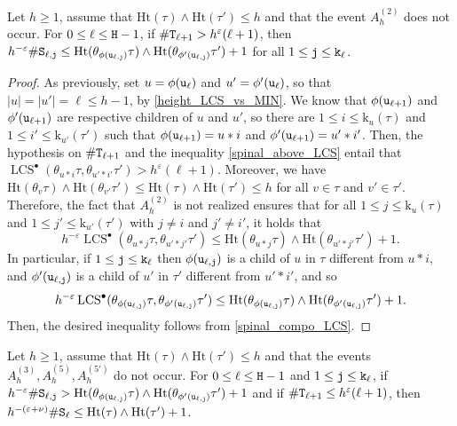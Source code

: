 \documentclass[11pt,reqno]{amsart}
\newcommand{\Ht}{\mathrm{Ht}}
\newcommand{\rk}{\mathrm{k}}
\newcommand{\LCS}{\operatorname{LCS}}
\newcommand{\eps}{\varepsilon}
\begin{document}
\begin{lem}
\label{lem:A1_cases}
Let $h\geq 1$, assume that $\Ht(\tau)\wedge\Ht(\tau')\leq h$ and that the event $A_h^{(2)}$ does not occur. For $0\leq \ell\leq \mathtt{H}-1$, if $\# \mathtt{T}_{\ell+1}> h^\varepsilon (\ell+1)$, then $h^{-\varepsilon}\# \ttS_{\ell,\ttj} \leq  \Ht(\theta_{\phi(\ttu_{\ell,\ttj})}\tau)\wedge \Ht(\theta_{\phi'(\ttu_{\ell,\ttj})}\tau')+1$ for all $1\leq \mathtt{j}\leq \mathtt{k}_\ell$.
\end{lem}

\begin{proof}
As previously, set $u=\phi(\mathtt{u}_\ell)$ and $u'=\phi'(\mathtt{u}_\ell)$, so that $|u|=|u'|=\ell\leq h-1$, by \eqref{height_LCS_vs_MIN}. We know that $\phi(\mathtt{u}_{\ell+1})$ and $\phi'(\mathtt{u}_{\ell+1})$ are respective children of $u$ and $u'$, so there are $1\leq i\leq \rk_u(\tau)$ and $1\leq i'\leq \rk_{u'}(\tau')$ such that $\phi(\mathtt{u}_{\ell+1})=u*i$ and $\phi'(\mathtt{u}_{\ell+1})=u'*i'$. Then, the hypothesis on $\#\mathtt{T}_{\ell+1}$ and the inequality \eqref{spinal_above_LCS} entail that $\LCS^\bullet(\theta_{u*i}\tau,\theta_{u'*i'}\tau')> h^\varepsilon(\ell+1)$. Moreover, we have $\Ht(\theta_v\tau)\wedge \Ht(\theta_{v'}\tau')\leq \Ht(\tau)\wedge\Ht(\tau')\leq h$ for all $v\in\tau$ and $v'\in\tau'$. Therefore, the fact that $A_h^{(2)}$ is not realized ensures that for all $1\leq j\leq \rk_u(\tau)$ and $1\leq j'\leq \rk_{u'}(\tau')$ with $j\neq i$ and $j'\neq i'$, it holds that 
\[h^{-\varepsilon}\LCS^\bullet(\theta_{u*j}\tau,\theta_{u'*j'}\tau')\leq \Ht(\theta_{u*j}\tau)\wedge\Ht(\theta_{u'*j'}\tau')+1.\]
In particular, if $1\leq \mathtt{j}\leq \mathtt{k}_\ell$ then $\phi(\mathtt{u}_{\ell,\mathtt{j}})$ is a child of $u$ in $\tau$ different from $u*i$, and $\phi'(\mathtt{u}_{\ell,\mathtt{j}})$ is a child of $u'$ in $\tau'$ different from $u'*i'$, and so \[h^{-\varepsilon}\LCS^\bullet(\theta_{\phi(\ttu_{\ell,\ttj})}\tau,\theta_{\phi'(\ttu_{\ell,\ttj})}\tau')\leq \Ht(\theta_{\phi(\ttu_{\ell,\ttj})}\tau)\wedge\Ht(\theta_{\phi'(\ttu_{\ell,\ttj})}\tau')+1.\]
Then, the desired inequality follows from \eqref{spinal_compo_LCS}.
\end{proof}

\begin{lem}
\label{lem:A2_cases}
Let $h\geq 1$, assume that $\Ht(\tau)\wedge\Ht(\tau')\leq h$ and that the events $A_h^{(3)},A_h^{(5)},A_h^{(5')}$ do not occur. For $0\leq \ell \leq \mathtt{H}-1$ and $1\leq \mathtt{j}\leq \mathtt{k}_\ell$, if $h^{-\varepsilon}\# \ttS_{\ell,\ttj} > \Ht(\theta_{\phi(\ttu_{\ell,\ttj})}\tau)\wedge \Ht(\theta_{\phi'(\ttu_{\ell,\ttj})}\tau')+1$ and if $\#\mathtt{T}_{\ell+1}\leq h^\varepsilon(\ell+1)$, then $h^{-(\eps+\nu)}\# \ttS_\ell\leq \Ht(\tau)\wedge\Ht(\tau')+1$.
\end{lem}
\end{document}
